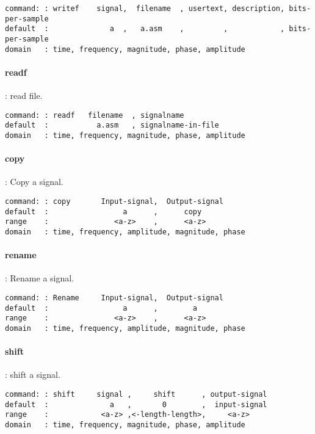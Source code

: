 \documentclass{report}
\newcommand{\bc}{\scriptsize}
\newcommand{\ec}{\normalsize}
\begin{document}
\bc
\begin{verbatim}
command: : writef    signal,  filename  , usertext, description, bits-per-sample
default  :              a  ,   a.asm    ,         ,            , bits-per-sample
domain   : time, frequency, magnitude, phase, amplitude
\end{verbatim}
\ec

\paragraph{readf}: read file.

\bc
\begin{verbatim}
command: : readf   filename  , signalname
default  :           a.asm   , signalname-in-file
domain   : time, frequency, magnitude, phase, amplitude
\end{verbatim}
\ec

\paragraph{copy}: Copy a signal.

\bc
\begin{verbatim}
command: : copy       Input-signal,  Output-signal
default  :                 a      ,      copy
range    :               <a-z>    ,      <a-z>
domain   : time, frequency, amplitude, magnitude, phase
\end{verbatim}
\ec

\paragraph{rename}: Rename a signal.

\bc
\begin{verbatim}
command: : Rename     Input-signal,  Output-signal
default  :                 a      ,        a
range    :               <a-z>    ,      <a-z>
domain   : time, frequency, amplitude, magnitude, phase
\end{verbatim}
\ec


\paragraph{shift}: shift a signal.

\bc
\begin{verbatim}
command: : shift     signal ,     shift      , output-signal
default  :              a   ,       0        ,  input-signal
range    :            <a-z> ,<-length-length>,     <a-z>
domain   : time, frequency, magnitude, phase, amplitude
\end{verbatim}
\ec
\end{document}
